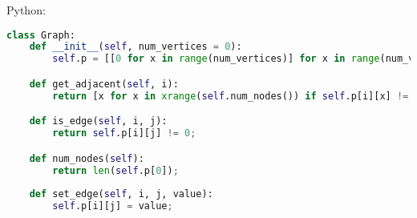 Python:
\begin{lstlisting}[language=Python]
class Graph:
    def __init__(self, num_vertices = 0):
        self.p = [[0 for x in range(num_vertices)] for x in range(num_vertices)];

    def get_adjacent(self, i):
        return [x for x in xrange(self.num_nodes()) if self.p[i][x] != 0];

    def is_edge(self, i, j):
        return self.p[i][j] != 0;

    def num_nodes(self):
        return len(self.p[0]);
        
    def set_edge(self, i, j, value):
        self.p[i][j] = value;
\end{lstlisting}